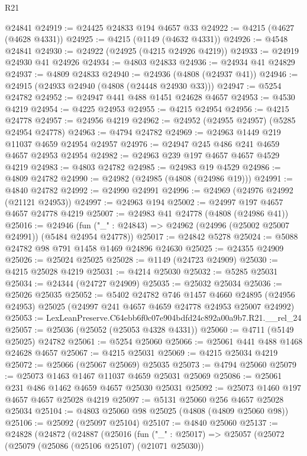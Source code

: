 \begin{lexlean}{R21}
\begin{coremodule}
    @24841
@24919 := @24425 @24833 @194 @4657 @33
@24922 := @4215 (@4627 (@4628 @4331))
@24925 := @4215 (@1149 (@4632 @4331))
@24926 := @4548 @24841
@24930 := @24922 (@24925 (@4215 @24926 @4219))
@24933 := @24919 @24930 @41 @24926
@24934 := @4803 @24833
@24936 := @24934 @41 @24829
@24937 := @4809 @24833
@24940 := @24936 (@4808 (@24937 @41))
@24946 := @24915 (@24933 @24940 (@4808 (@24448 @24930 @33)))
@24947 := @5254 @24782
@24952 := @24947 @441 @488 @1451 @24628 @4657
@24953 := @4530 @4219
@24954 := @4225 @24953
@24955 := @4215 @24954
@24956 := @4215 @24778
@24957 := @24956 @4219
@24962 := @24952 (@24955 @24957) (@5285 @24954 @24778)
@24963 := @4794 @24782
@24969 := @24963 @1449 @219 @11037 @4659 @24954 @24957
@24976 := @24947 @245 @486 @241 @4659 @4657 @24953 @24954
@24982 := @24963 @239 @197 @4657 @4657 @4529 @4219
@24983 := @4803 @24782
@24985 := @24983 @19 @4529
@24986 := @4809 @24782
@24990 := @24982 (@24985 (@4808 (@24986 @19)))
@24991 := @4840 @24782
@24992 := @24990 @24991
@24996 := @24969 (@24976 @24992 (@21121 @24953))
@24997 := @24963 @194
@25002 := @24997 @197 @4657 @4657 @24778 @4219
@25007 := @24983 @41 @24778 (@4808 (@24986 @41))
@25016 := @24946
    (fun ("_" : @24843) => @24962 (@24996 (@25002 @25007 @24991)) (@5484 @24954 @24778))
@25017 := @24842 @5278
@25024 := @5088 @24782 @98 @791 @1458 @1469 @24896 @24630
@25025 := @24355 @24909
@25026 := @25024 @25025
@25028 := @1149 (@24723 @24909)
@25030 := @4215 @25028 @4219
@25031 := @4214 @25030
@25032 := @5285 @25031
@25034 := @24344 (@24727 @24909)
@25035 := @25032 @25034
@25036 := @25026 @25035
@25052 := @5402
    @24782
    @746
    @1457
    @4660
    @24895
    (@24956 @24953)
    @25025
    (@24997 @241 @4657 @4659 @24778 @24953 @25007 @24992)
@25053 := LexLeanPreserve.C64ebb6f0c07e904bdfd24c892a00a9b7.R21.__rel_24
@25057 := @25036 (@25052 (@25053 @4328 @4331))
@25060 := @4711 (@5149 @25025) @24782
@25061 := @5254 @25060
@25066 := @25061 @441 @488 @1468 @24628 @4657
@25067 := @4215 @25031
@25069 := @4215 @25034 @4219
@25072 := @25066 (@25067 @25069) @25035
@25073 := @4794 @25060
@25079 := @25073 @1463 @1467 @11037 @4659 @25031 @25069
@25086 := @25061 @231 @486 @1462 @4659 @4657 @25030 @25031
@25092 := @25073 @1460 @197 @4657 @4657 @25028 @4219
@25097 := @5131 @25060 @256 @4657 @25028 @25034
@25104 := @4803 @25060 @98 @25025 (@4808 (@4809 @25060 @98))
@25106 := @25092 (@25097 @25104)
@25107 := @4840 @25060
@25137 := @24828
    (@24872
      (@24887
        (@25016
          (fun ("_" : @25017) =>
          @25057
            (@25072
              (@25079
                (@25086 (@25106 @25107) (@21071 @25030))

\end{coremodule}
\end{lexlean}
